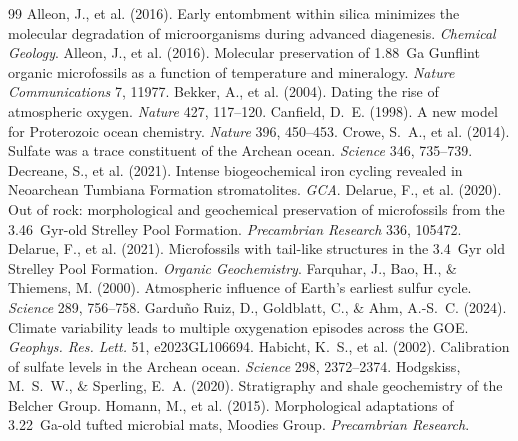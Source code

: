 \documentclass[11pt]{article}
\begin{document}

\begin{thebibliography}{99}\footnotesize\linespread{0.92}\selectfont\setlength{\itemsep}{0pt}\setlength{\parskip}{0pt}
 Alleon, J., et al. (2016). Early entombment within
silica minimizes the molecular degradation of microorganisms during advanced diagenesis.
\textit{Chemical Geology}.
 Alleon, J., et al. (2016). Molecular preservation of
1.88~Ga Gunflint organic microfossils as a function of temperature and mineralogy. \textit{Nature
Communications} 7, 11977.
 Bekker, A., et al. (2004). Dating the rise of atmospheric
oxygen. \textit{Nature} 427, 117--120.
 Canfield, D.~E. (1998). A new model for Proterozoic ocean
chemistry. \textit{Nature} 396, 450--453.
 Crowe, S.~A., et al. (2014). Sulfate was a trace constituent
of the Archean ocean. \textit{Science} 346, 735--739.
 Decreane, S., et al. (2021). Intense biogeochemical
iron cycling revealed in Neoarchean Tumbiana Formation stromatolites. \textit{GCA}.
 Delarue, F., et al. (2020). Out of rock: morphological
and geochemical preservation of microfossils from the 3.46~Gyr-old Strelley Pool Formation.
\textit{Precambrian Research} 336, 105472.
 Delarue, F., et al. (2021). Microfossils with tail-like
structures in the 3.4~Gyr old Strelley Pool Formation. \textit{Organic Geochemistry}.
 Farquhar, J., Bao, H., \& Thiemens, M. (2000).
Atmospheric influence of Earth's earliest sulfur cycle. \textit{Science} 289, 756--758.
 Gardu\~{n}o Ruiz, D., Goldblatt, C., \& Ahm,
A.-S.~C. (2024). Climate variability leads to multiple oxygenation episodes across the GOE.
\textit{Geophys. Res. Lett.} 51, e2023GL106694.
 Habicht, K.~S., et al. (2002). Calibration of sulfate
levels in the Archean ocean. \textit{Science} 298, 2372--2374.
 Hodgskiss, M.~S.~W., \& Sperling, E.~A. (2020).
Stratigraphy and shale geochemistry of the Belcher Group.
 Homann, M., et al. (2015). Morphological adaptations of
3.22~Ga-old tufted microbial mats, Moodies Group. \textit{Precambrian Research}.

\end{thebibliography}
\end{document}
